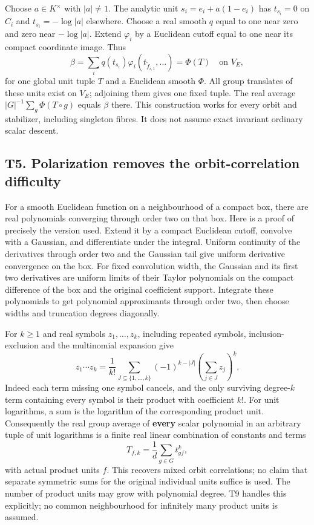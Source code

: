 \documentclass[
  10pt,
]{article}
\begin{document}
Choose \(a\in K^\times\) with \(|a|\ne1\). The analytic unit
\(s_i=e_i+a(1-e_i)\) has \(t_{s_i}=0\) on \(C_i\) and
\(t_{s_i}=-\log|a|\) elsewhere. Choose a real smooth \(q\) equal to one
near zero and zero near \(-\log|a|\). Extend \(\varphi_i\) by a
Euclidean cutoff equal to one near its compact coordinate image. Thus \[
 \beta=\sum_i q(t_{s_i})\varphi_i(t_{\widetilde f_{i,1}},\ldots)
                          =\Phi(T)\quad\text{on }V_E,   \tag{8}
\] for one global unit tuple \(T\) and a Euclidean smooth \(\Phi\). All
group translates of these units exist on \(V_E\); adjoining them gives
one fixed tuple. The real average \(|G|^{-1}\sum_g\Phi(T\circ g)\)
equals \(\beta\) there. This construction works for every orbit and
stabilizer, including singleton fibres. It does not assume exact
invariant ordinary scalar descent.

\subsection{T5. Polarization removes the orbit-correlation
difficulty}\label{t5.-polarization-removes-the-orbit-correlation-difficulty}

For a smooth Euclidean function on a neighbourhood of a compact box,
there are real polynomials converging through order two on that box.
Here is a proof of precisely the version used. Extend it by a compact
Euclidean cutoff, convolve with a Gaussian, and differentiate under the
integral. Uniform continuity of the derivatives through order two and
the Gaussian tail give uniform derivative convergence on the box. For
fixed convolution width, the Gaussian and its first two derivatives are
uniform limits of their Taylor polynomials on the compact difference of
the box and the original coefficient support. Integrate these
polynomials to get polynomial approximants through order two, then
choose widths and truncation degrees diagonally.

For \(k\ge1\) and real symbols \(z_1,\ldots,z_k\), including repeated
symbols, inclusion-exclusion and the multinomial expansion give \[
 z_1\cdots z_k=\frac1{k!}\sum_{J\subseteq\{1,\ldots,k\}}
            (-1)^{k-|J|}\left(\sum_{j\in J}z_j\right)^k. \tag{9}
\] Indeed each term missing one symbol cancels, and the only surviving
degree-\(k\) term containing every symbol is their product with
coefficient \(k!\). For unit logarithms, a sum is the logarithm of the
corresponding product unit. Consequently the real group average of
\textbf{every} scalar polynomial in an arbitrary tuple of unit
logarithms is a finite real linear combination of constants and terms \[
        T_{f,k}=\frac1d\sum_{g\in G}t_{gf}^{k},          \tag{10}
\] with actual product units \(f\). This recovers mixed orbit
correlations; no claim that separate symmetric sums for the original
individual units suffice is used. The number of product units may grow
with polynomial degree. T9 handles this explicitly; no common
neighbourhood for infinitely many product units is assumed.
\end{document}
